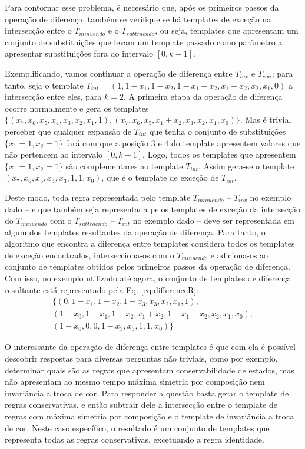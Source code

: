 \documentclass[12pt, a4paper]{article}
\begin{document}
Para contornar esse problema, é necessário que, após os primeiros passos da operação de diferença, também se verifique se há templates de exceção na intersecção entre o $T_{minuendo}$ e o $T_{subtraendo}$, ou seja, templates que apresentam um conjunto de substituições que levam um template passado como parâmetro a apresentar substituições fora do intervalo $[0,k-1]$. %

Exemplificando, vamos continuar a operação de diferença entre $T_{inv}$ e $T_{con}$; para tanto, seja o template $T_{int} = (1, 1 - x_1, 1 - x_2, 1 - x_1 - x_2, x_1 + x_2, x_2, x_1, 0)$ a intersecção entre eles, para $k=2$.
A primeira etapa da operação de diferença ocorre normalmente e gera os templates $\{(x_7, x_6, x_5, x_4, x_3, x_2, x_1, 1),(x_7, x_6, x_5, x_1 + x_2, x_3, x_2, x_1, x_0)\}$.
Mas é trivial perceber que qualquer expansão de $T_{int}$ que tenha o conjunto de substituições $\{x_1 = 1, x_2 = 1\}$ fará com que a posição $3$ e $4$ do template apresentem valores que não pertencem ao intervalo $[0,k-1]$.
Logo, todos os templates que apresentem $\{x_1 = 1, x_2 = 1\}$ são complementares ao template $T_{int}$. Assim gera-se o template $(x_7, x_6, x_5, x_4, x_3, 1, 1, x_0)$, que é o template de exceção de $T_{int}$.

Deste modo, toda regra representada pelo template $T_{minuendo}$ -- $T_{inv}$ no exemplo dado -- e que também seja representada pelos templates de exceção da intersecção do $T_{minuendo}$ com o $T_{subtraendo}$ -- $T_{int}$ no exemplo dado -- deve ser representada em algum dos templates resultantes da operação de diferença. Para tanto, o algoritmo que encontra a diferença entre templates considera todos os templates de exceção encontrados, intersecciona-os com o $T_{minuendo}$ e adiciona-os ao conjunto de templates obtidos pelos primeiros passos da operação de diferença. Com isso, no exemplo utilizado até agora, o conjunto de templates de diferença resultante está representado pela Eq. \ref{eq:differenceR}:\begin{equation}
\begin{split}
\{(0, 1 - x_1, 1 - x_2, 1 - x_3, x_3, x_2, x_1, 1), \\
(1 - x_0, 1 - x_1, 1 - x_2, x_1 + x_2, 1 - x_1 - x_2, x_2, x_1, x_0), \\
(1 - x_0, 0, 0, 1 - x_3, x_3, 1, 1, x_0)\}
\label{eq:differenceR}
\end{split}
\end{equation}

O interessante da operação de diferença entre templates é que com ela é possível descobrir respostas para diversas perguntas não triviais, como por exemplo, determinar quais são as regras que apresentam conservabilidade de estados, mas não apresentam ao mesmo tempo máxima simetria por composição nem invariância a troca de cor. Para responder a questão basta gerar o template de regras conservativas, e então subtrair dele a intersecção entre o template de regras com máxima simetria por composição e o template de invariância a troca de cor. Neste caso específico, o resultado é um conjunto de templates que representa todas as regras conservativas, excetuando a regra identidade.
\end{document}

